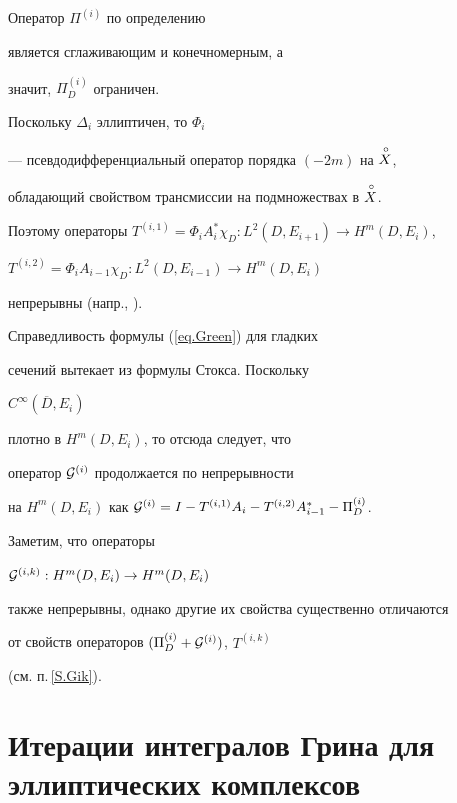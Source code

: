 \begin{pf}


Оператор $\Pi^{(i)}$ по определению


является сглаживающим и конечномерным, а


значит, $\Pi ^{(i)}_D$ ограничен.


Поскольку $\Delta_i$ эллиптичен, то $\Phi_i$


--- псевдодифференциальный оператор порядка $(-2m)$ на $\overset{\,\circ}{X}{}$,


обладающий свойством трансмиссии на подмножествах в $\overset{\,\circ}{X}{}$.


Поэтому операторы $T^{(i,1)}=\Phi_i A^*_i \chi_D :


L^{2} (D, E_{i+1}) \to H^{m} (D,E_i)$,


$T^{(i,2)}=\Phi_i A_{i-1} \chi_D :


L^{2} (D, E_{i-1}) \to H^{m} (D,E_i) $


непрерывны (напр., \cite{Tark36}).





Справедливость формулы (\ref{eq.Green}) для гладких


сечений вытекает из формулы Стокса. Поскольку 


$C^\infty (\overline D, E_i)$


плотно в $H^m (D,E_i)$, то отсюда следует, что


оператор ${\cal G}^{(i)}$ продолжается по непрерывности


на $H^m (D, E_i)$ как ${\cal G}^{(i)}=I- T^{(i,1)} A_i -


T^{(i,2)} A^*_{i-1}- \Pi ^{(i)}_D$.


\end{pf}





Заметим, что операторы


${\cal G}^{(i,k)} : H^{m} (D,E_i) \to H^{m} (D,E_i)$


также непрерывны, однако другие их свойства существенно отличаются


от свойств операторов $(\Pi^{(i)}_D+{\cal G}^{(i)})$, $T^{(i,k)}$


(см. п.\,\ref{S.Gik}).








\section{Итерации интегралов Грина для эллиптических комплексов}


